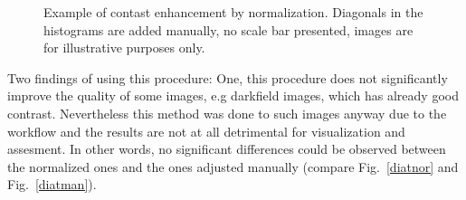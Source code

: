 \begin{figure}[h!]
 \hspace{0.1mm}
\caption{Example of contast enhancement by normalization. 
Diagonals in the histograms are added manually, no scale bar presented, images are for illustrative purposes only.}
\label{fig:normcompare}
\end{figure}

Two findings of using this procedure: One, this procedure does not significantly improve the quality of some images, e.g darkfield images, which has already good contrast. 
Nevertheless this method was done to such images anyway due to the workflow and the results are not at all detrimental for visualization and assesment. 
In other words, no significant differences could be observed between the normalized ones and the ones adjusted manually (compare Fig.~\ref{diatnor} and Fig.~\ref{diatman}). 

